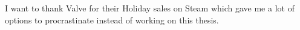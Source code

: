 I want to thank Valve for their Holiday sales on Steam which gave me a lot
of options to procrastinate instead of working on this thesis.
